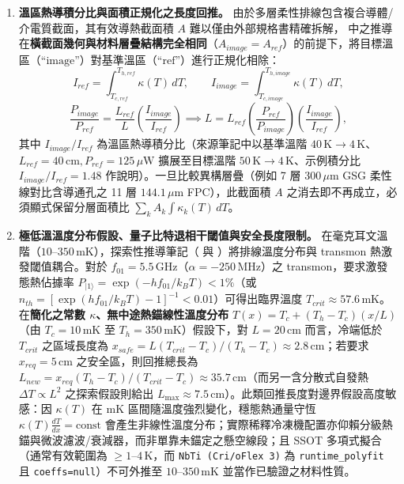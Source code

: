 \documentclass[11pt,a4paper]{article}
\begin{document}
\begin{enumerate}[leftmargin=*]
\item \textbf{溫區熱導積分比與面積正規化之長度回推。} 由於多層柔性排線包含複合導體/介電質截面，其有效導熱截面積 $A$ 難以僅由外部規格書精確拆解， 中之推導在\textbf{橫截面幾何與材料層疊結構完全相同}（$A_{image}=A_{ref}$）的前提下，將目標溫區（``$\mathrm{image}$''）對基準溫區（``$\mathrm{ref}$''）進行正規化相除：
\begin{equation}
I_{ref}=\int_{T_{c,ref}}^{T_{h,ref}}\kappa(T)\,dT, \qquad I_{image}=\int_{T_{c,image}}^{T_{h,image}}\kappa(T)\,dT,
\end{equation}
\begin{equation}
\frac{P_{image}}{P_{ref}} = \frac{L_{ref}}{L}\left(\frac{I_{image}}{I_{ref}}\right) \implies L = L_{ref}\left(\frac{P_{ref}}{P_{image}}\right)\left(\frac{I_{image}}{I_{ref}}\right),
\end{equation}
其中 $I_{image}/I_{ref}$ 為溫區熱導積分比（來源筆記中以基準溫階 $40\,\mathrm{K}\to 4\,\mathrm{K}$、$L_{ref}=40\,\mathrm{cm}, P_{ref}=125\,\mu\mathrm{W}$ 擴展至目標溫階 $50\,\mathrm{K}\to 4\,\mathrm{K}$、示例積分比 $I_{image}/I_{ref}=1.48$ 作說明）。一旦比較異構層疊（例如 7 層 $300\,\mu\mathrm{m}$ GSG 柔性線對比含導通孔之 11 層 $144.1\,\mu\mathrm{m}$ FPC），此截面積 $A$ 之消去即不再成立，必須顯式保留分層面積比 $\sum_k A_k\int\kappa_k(T)\,dT$。

\item \textbf{極低溫溫度分布假設、量子比特退相干閾值與安全長度限制。} 在毫克耳文溫階（$10\text{--}350\,\mathrm{mK}$），探索性推導筆記（ 與 ）將排線溫度分布與 transmon 熱激發閾值耦合。對於 $f_{01}=5.5\,\mathrm{GHz}$（$\alpha=-250\,\mathrm{MHz}$）之 transmon，要求激發態熱佔據率 $P_{|1\rangle}=\exp(-hf_{01}/k_B T)<1\%$（或 $n_{th}=[\exp(hf_{01}/k_B T)-1]^{-1}<0.01$）可得出臨界溫度 $T_{crit}\approx 57.6\,\mathrm{mK}$。在\textbf{簡化之常數 $\kappa$、無中途熱錨線性溫度分布} $T(x)=T_c+(T_h-T_c)(x/L)$（由 $T_c=10\,\mathrm{mK}$ 至 $T_h=350\,\mathrm{mK}$）假設下，對 $L=20\,\mathrm{cm}$ 而言，冷端低於 $T_{crit}$ 之區域長度為 $x_{safe}=L(T_{crit}-T_c)/(T_h-T_c)\approx 2.8\,\mathrm{cm}$；若要求 $x_{req}=5\,\mathrm{cm}$ 之安全區，則回推總長為 $L_{new}=x_{req}(T_h-T_c)/(T_{crit}-T_c)\approx 35.7\,\mathrm{cm}$（而另一含分散式自發熱 $\Delta T\propto L^2$ 之探索假設則給出 $L_{\max}\approx 7.5\,\mathrm{cm}$）。此類回推長度對邊界假設高度敏感：因 $\kappa(T)$ 在 mK 區間隨溫度強烈變化，穩態熱通量守恆 $\kappa(T)\frac{dT}{dx}=\mathrm{const}$ 會產生非線性溫度分布；實際稀釋冷凍機配置亦仰賴分級熱錨與微波濾波/衰減器，而非單靠未錨定之懸空線段；且 SSOT 多項式擬合（通常有效範圍為 $\ge 1\text{--}4\,\mathrm{K}$，而 \texttt{NbTi (Cri/oFlex 3)} 為 \texttt{runtime\_polyfit} 且 \texttt{coeffs=null}）不可外推至 $10\text{--}350\,\mathrm{mK}$ 並當作已驗證之材料性質。
\end{enumerate}
\end{document}
